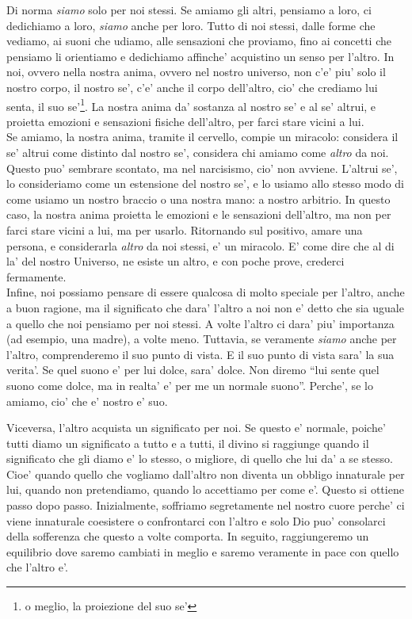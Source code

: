 Di norma \emph{siamo} solo per noi stessi. Se amiamo gli altri, pensiamo a loro, ci dedichiamo a loro, \emph{siamo} anche per loro. Tutto di noi stessi, dalle forme che vediamo, ai suoni che udiamo, alle sensazioni che proviamo, fino ai concetti che pensiamo li orientiamo e dedichiamo affinche' acquistino un senso per l'altro. In noi, ovvero nella nostra anima, ovvero nel nostro universo, non c'e' piu' solo il nostro corpo, il nostro se', c'e' anche il corpo dell'altro, cio' che crediamo lui senta, il suo se'\footnote{o meglio, la proiezione del suo se'}. La nostra anima da' sostanza al nostro se' e al se' altrui, e proietta emozioni e sensazioni fisiche dell'altro, per farci stare vicini a lui. \\
Se amiamo, la nostra anima, tramite il cervello, compie un miracolo: considera il se' altrui come distinto dal nostro se', considera chi amiamo come \emph{altro} da noi. Questo puo' sembrare scontato, ma nel narcisismo, cio' non avviene. L'altrui se', lo consideriamo come un estensione del nostro se', e lo usiamo allo stesso modo di come usiamo un nostro braccio o una nostra mano: a nostro arbitrio. In questo caso, la nostra anima proietta le emozioni e le sensazioni dell'altro, ma non per farci stare vicini a lui, ma per usarlo. Ritornando sul positivo, amare una persona, e considerarla \emph{altro} da noi stessi, e' un miracolo. E' come dire che al di la' del nostro Universo, ne esiste un altro, e con poche prove, crederci fermamente.\\
Infine, noi possiamo pensare di essere qualcosa di molto speciale per l'altro, anche a buon ragione, ma il significato che dara' l'altro a noi non e' detto che sia uguale a quello che noi pensiamo per noi stessi. A volte l'altro ci dara' piu' importanza (ad esempio, una madre), a volte meno. Tuttavia, se veramente \emph{siamo} anche per l'altro, comprenderemo il suo punto di vista. E il suo punto di vista sara' la sua verita'. Se quel suono e' per lui dolce, sara' dolce. Non diremo ``lui sente quel suono come dolce, ma in realta' e' per me un normale suono''. Perche', se lo amiamo, cio' che e' nostro e' suo.

Viceversa, l'altro acquista un significato per noi. Se questo e' normale, poiche' tutti diamo un significato a tutto e a tutti, il divino si raggiunge quando il significato che gli diamo e' lo stesso, o migliore, di quello che lui da' a se stesso. Cioe' quando quello che vogliamo dall'altro non diventa un obbligo innaturale per lui, quando non pretendiamo, quando lo accettiamo per come e'. Questo si ottiene passo dopo passo. Inizialmente, soffriamo segretamente nel nostro cuore perche' ci viene innaturale coesistere o confrontarci con l'altro e solo Dio puo' consolarci della sofferenza che questo a volte comporta. In seguito, raggiungeremo un equilibrio dove saremo cambiati in meglio e saremo veramente in pace con quello che l'altro e'.

